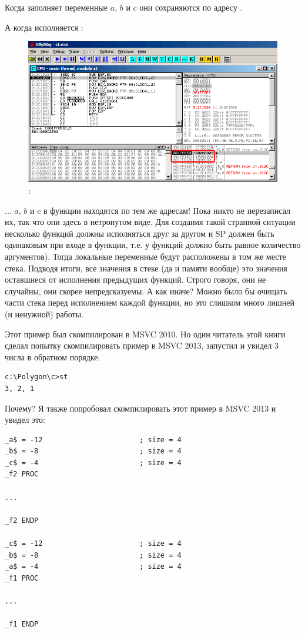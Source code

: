 Когда  заполняет переменные $a$, $b$ и $c$ они сохраняются по адресу  \etc{}.

\clearpage
А когда исполняется :

\begin{figure}[H]
\centering
\includegraphics[scale=\FigScale]{patterns/02_stack/08_noise/olly2.png}
\caption{\olly: }
\label{fig:stack_noise_olly2}
\end{figure}

... $a$, $b$ и $c$ в функции  находятся по тем же адресам!
Пока никто не перезаписал их, так что они здесь в нетронутом виде.
Для создания такой странной ситуации несколько функций должны исполняться друг за другом
и \ac{SP} должен быть одинаковым при входе в функции, т.е. у функций должно быть равное количество
аргументов). Тогда локальные переменные будут расположены в том же месте стека.
Подводя итоги, все значения в стеке (да и памяти вообще) это значения оставшиеся от 
исполнения предыдущих функций.
Строго говоря, они не случайны, они скорее непредсказуемы.
А как иначе?
Можно было бы очищать части стека перед исполнением каждой функции,
но это слишком много лишней (и ненужной) работы.


Этот пример был скомпилирован в MSVC 2010.
Но один читатель этой книги сделал попытку скомпилировать пример в MSVC 2013, запустил и увидел 3 числа в обратном порядке:

\begin{lstlisting}
c:\Polygon\c>st
3, 2, 1
\end{lstlisting}

Почему?
Я также попробовал скомпилировать этот пример в MSVC 2013 и увидел это:

\begin{lstlisting}[caption=MSVC 2013]
_a$ = -12						; size = 4
_b$ = -8						; size = 4
_c$ = -4						; size = 4
_f2	PROC

...

_f2	ENDP

_c$ = -12						; size = 4
_b$ = -8						; size = 4
_a$ = -4						; size = 4
_f1	PROC

...

_f1	ENDP
\end{lstlisting}

